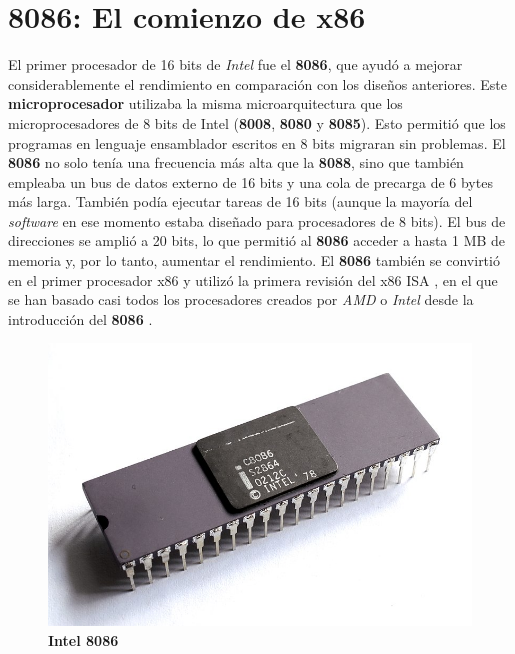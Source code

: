 \section{8086: El comienzo de x86}
El primer procesador de 16 bits de \emph{Intel} fue el \textbf{8086}, que ayudó a mejorar considerablemente el rendimiento en comparación
con los diseños anteriores. Este \textbf{microprocesador} utilizaba la misma microarquitectura que los microprocesadores de 8 bits de Intel
(\textbf{8008}, \textbf{8080} y \textbf{8085}). Esto permitió que los programas en lenguaje ensamblador escritos en 8 bits migraran sin
problemas. El \textbf{8086} no solo tenía una frecuencia más alta que la \textbf{8088}, sino que también empleaba un bus de datos externo
de 16 bits y una cola de precarga de 6 bytes más larga. También podía ejecutar tareas de 16 bits (aunque la mayoría del \emph{software} en
ese momento estaba diseñado para procesadores de 8 bits). El bus de direcciones se amplió a 20 bits, lo que permitió al \textbf{8086} acceder
a hasta 1 MB de memoria y, por lo tanto, aumentar el rendimiento. El \textbf{8086} también se convirtió en el primer procesador x86 y utilizó
la primera revisión del x86 ISA , en el que se han basado casi todos los procesadores creados por \emph{AMD}
o \emph{Intel} desde la introducción del \textbf{8086} .

\begin{figure}[htb]
	\centering
	\includegraphics[scale = 0.2]{Graphics/Intel_C8086.jpg}
	\caption{\textbf{Intel 8086}}
	\label{fig:16}
\end{figure}

